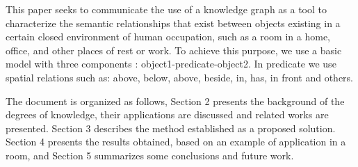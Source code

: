 This paper seeks to communicate the use of a knowledge graph as a tool to 
characterize the semantic relationships that exist between objects existing 
in a certain closed environment of human occupation, such as a room in a home, 
office, and other places of rest or work. To achieve this purpose, we use a 
basic model with three components : object1-predicate-object2. 
In predicate we use spatial relations such as: above, below, 
above, beside, in, has, in front and others.

The document is organized as follows, Section 2 presents the background of the 
degrees of knowledge, their applications are discussed and related works are 
presented. Section 3 describes the method established as a proposed solution. 
Section 4 presents the results obtained, based on an example of application in 
a room, and Section 5 summarizes some conclusions and future work.
